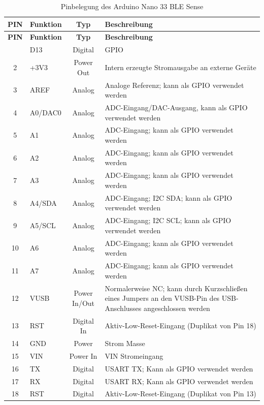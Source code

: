 \begin{longtable}{|c|p{2cm}|c|p{6.5cm}|}
	\caption{Pinbelegung des Arduino Nano 33 BLE Sense\cite{Arduino:2025}}
	\label{tab:Pinbelegung} \\
	\hline
	\textbf{PIN} & \textbf{Funktion} & \textbf{Typ} & \textbf{Beschreibung} \\
	\hline
	\endfirsthead
	\hline
	\textbf{PIN} & \textbf{Funktion} & \textbf{Typ} & \textbf{Beschreibung} \\
	\hline
	\endhead
	\hline
	\endfoot
	
	\hline
	1 & D13 & Digital & GPIO\\
	\hline
	2 & +3V3 & Power Out & Intern erzeugte Stromausgabe an externe Geräte \\
	\hline
	3 & AREF & Analog & Analoge Referenz; kann als GPIO verwendet werden \\
	\hline
	4 & A0/DAC0 & Analog & ADC-Eingang/DAC-Ausgang, kann als GPIO verwendet werden\\
	\hline
	5 & A1 & Analog & ADC-Eingang; kann als GPIO verwendet werden \\
	\hline
	6 & A2 & Analog & ADC-Eingang; kann als GPIO verwendet werden\\
	\hline
	7 & A3 & Analog & ADC-Eingang; kann als GPIO verwendet werden \\
	\hline
	8 & A4/SDA & Analog & ADC-Eingang; I2C SDA; kann als GPIO verwendet werden \\
	\hline
	9 & A5/SCL & Analog & ADC-Eingang; I2C SCL; kann als GPIO verwendet werden \\
	\hline
	10 & A6 & Analog & ADC-Eingang; kann als GPIO verwendet werden \\
	\hline
	11 & A7 & Analog & ADC-Eingang; kann als GPIO verwendet werden \\
	\hline
	12 & VUSB & Power In/Out & Normalerweise NC; kann durch Kurzschließen eines Jumpers an den VUSB-Pin des USB-Anschlusses angeschlossen werden \\
	\hline
	13 & RST & Digital In & Aktiv-Low-Reset-Eingang (Duplikat von Pin 18)\\
	\hline
	14 & GND & Power & Strom Masse \\
	\hline
	15 & VIN & Power In & VIN Stromeingang \\
	\hline
	16 & TX & Digital & USART TX; Kann als GPIO verwendet werden \\
	\hline
	17 & RX & Digital & USART RX; Kann als GPIO verwendet werden \\
	\hline
	18 & RST & Digital & Aktiv-Low-Reset-Eingang (Duplikat von Pin 13) \\

\end{longtable}
